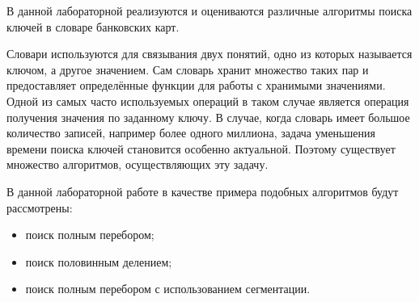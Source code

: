 В данной лабораторной реализуются и оцениваются различные алгоритмы поиска ключей в словаре банковских карт.

Словари используются для связывания двух понятий, одно из которых называется ключом, а другое значением. Сам словарь хранит множество таких пар и предоставляет определённые функции для работы с хранимыми значениями. Одной из самых часто используемых операций в таком случае является операция получения значения по заданному ключу. В случае, когда словарь имеет большое количество записей, например более одного миллиона, задача уменьшения времени поиска ключей становится особенно актуальной. Поэтому существует множество алгоритмов, осуществляющих эту задачу.

В данной лабораторной работе в качестве примера подобных алгоритмов будут рассмотрены:
\begin{itemize}
	\item поиск полным перебором;
	\item поиск половинным делением;
	\item поиск полным перебором с использованием сегментации.
\end{itemize}
